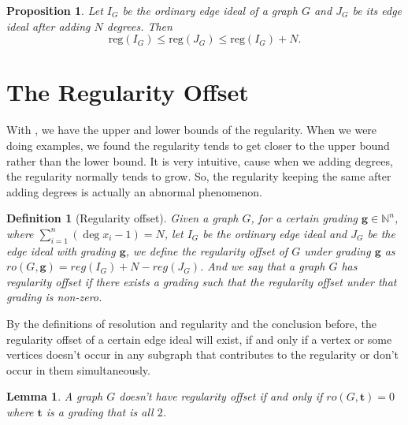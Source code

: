 \documentclass[dvipsnames,10pt]{article}
\newtheorem{lemma}[theorem]{Lemma}
\newtheorem{proposition}[theorem]{Proposition}
\newtheorem{defi}[theorem]{Definition}
\begin{document}
\begin{proposition}
    Let $I_G$ be the ordinary edge ideal of a graph $G$ and $J_G$ be its edge ideal after adding $N$ degrees. Then
    \begin{equation*}
        \mathrm{reg}(I_G) \leqslant \mathrm{reg} (J_G) \leqslant \mathrm{reg} (I_G)+N.
    \end{equation*}
\end{proposition}

\section{The Regularity Offset}

With , we have the upper and lower bounds of the regularity. When we were doing examples, we found the regularity tends to get closer to the upper bound rather than the lower bound. It is very intuitive, cause when we adding degrees, the regularity normally tends to grow. So, the regularity keeping the same after adding degrees is actually an abnormal phenomenon.

\begin{defi}[Regularity offset]
   Given a graph $G$, for a certain grading $\mathbf{g}\in\mathbb{N}^n$, where $\sum_{i=1}^{n} (\deg x_i-1)=N$, let $I_G$ be the ordinary edge ideal and $J_G$ be the edge ideal with grading $\mathbf{g}$, we define the regularity offset of $G$ under grading $\mathbf{g}$ as $ro(G,\mathbf{g})=reg(I_G)+N-reg(J_G)$. And we say that a graph $G$ has regularity offset if there exists a grading such that the regularity offset under that grading is non-zero.
   
\end{defi}

By the definitions of resolution and regularity and the conclusion before, the regularity offset of a certain edge ideal will exist, if and only if a vertex or some vertices doesn't occur in any subgraph that contributes to the regularity or don't occur in them simultaneously. 

\begin{lemma}
    A graph $G$ doesn't have regularity offset if and only if $ro(G,\mathbf{t})=0$ where $\mathbf{t}$ is a grading that is all $2$.
\end{lemma}
\end{document}

